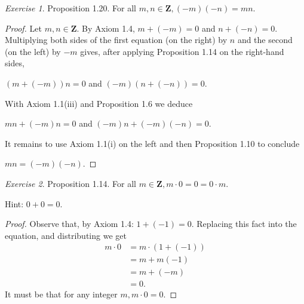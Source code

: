 \documentclass[12pt,oneside]{amsart}
\theoremstyle{remark}
\newtheorem{exer}{Exercise}
\begin{document}
\newpage
\begin{exer}

Proposition 1.20. For all $m,n \in \mathbf{Z}, (-m)(-n) = mn$.
\end{exer}

\begin{proof}
Let $m,n \in \mathbf{Z}$. By Axiom 1.4, $m + (-m) = 0$ and $n + (-n) = 0$. Multiplying both sides of the first equation (on the right) by $n$ and the second (on the left) by $-m$ gives, after applying Proposition 1.14 on the right-hand sides,

$(m + (-m))n = 0$ and $(-m)(n + (-n)) = 0$.

With Axiom 1.1(iii) and Proposition 1.6 we deduce

$mn + (-m)n = 0$ and $(-m)n + (-m)(-n) = 0$.

It remains to use Axiom 1.1(i) on the left and then Proposition 1.10 to conclude

$mn = (-m)(-n)$.
\end{proof}

\newpage
\begin{exer}
Proposition 1.14. For all $m \in \mathbf{Z}, m \cdot 0 = 0 = 0 \cdot m$.

Hint: $0 + 0 = 0.$
\end{exer}

\begin{proof}
Observe that, by Axiom 1.4: $1 + (-1) = 0$. Replacing this fact into the equation, and distributing we get
\begin{align*}
m \cdot 0 &= m \cdot (1 + (-1)) \\
          &= m + m(-1) \tag{Axiom 1.1.3} \\
          &= m + (-m) \tag{Axiom 1.1.3} \\
          &= 0. \tag{Axiom 1.4}
\end{align*}
It must be that for any integer $m, m \cdot 0 = 0$.
\end{proof}
\end{document}
